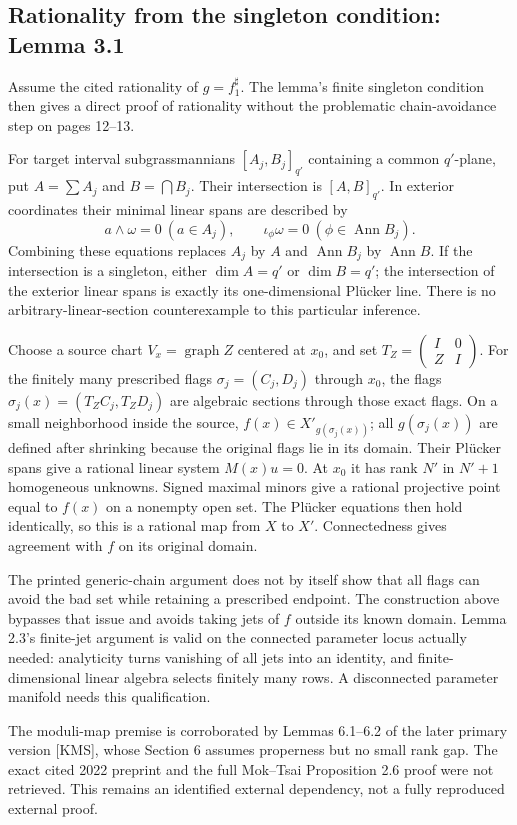 \documentclass[10pt]{article}
\begin{document}
\subsection*{Rationality from the singleton condition: Lemma 3.1}
Assume the cited rationality of \(g=f_1^\sharp\). The lemma’s finite singleton condition then gives a direct proof of rationality without the problematic chain-avoidance step on pages 12–13.\par
For target interval subgrassmannians \([A_j,B_j]_{q'}\) containing a common \(q'\)-plane, put \(A=\sum A_j\) and \(B=\bigcap B_j\). Their intersection is \([A,B]_{q'}\). In exterior coordinates their minimal linear spans are described by \[a\wedge\omega=0\ (a\in A_j),\qquad
 \iota_\phi\omega=0\ (\phi\in\operatorname{Ann}B_j).\] Combining these equations replaces \(A_j\) by \(A\) and \(\operatorname{Ann}B_j\) by \(\operatorname{Ann}B\). If the intersection is a singleton, either \(\dim A=q'\) or \(\dim B=q'\); the intersection of the exterior linear spans is exactly its one-dimensional Plücker line. There is no arbitrary-linear-section counterexample to this particular inference.\par
Choose a source chart \(V_x=\operatorname{graph}Z\) centered at \(x_0\), and set \(T_Z=\left(\begin{smallmatrix}I&0\\Z&I\end{smallmatrix}\right)\). For the finitely many prescribed flags \(\sigma_j=(C_j,D_j)\) through \(x_0\), the flags \(\sigma_j(x)=(T_ZC_j,T_ZD_j)\) are algebraic sections through those exact flags. On a small neighborhood inside the source, \(f(x)\in X'_{g(\sigma_j(x))}\); all \(g(\sigma_j(x))\) are defined after shrinking because the original flags lie in its domain. Their Plücker spans give a rational linear system \(M(x)u=0\). At \(x_0\) it has rank \(N'\) in \(N'+1\) homogeneous unknowns. Signed maximal minors give a rational projective point equal to \(f(x)\) on a nonempty open set. The Plücker equations then hold identically, so this is a rational map from \(X\) to \(X'\). Connectedness gives agreement with \(f\) on its original domain.\par
The printed generic-chain argument does not by itself show that all flags can avoid the bad set while retaining a prescribed endpoint. The construction above bypasses that issue and avoids taking jets of \(f\) outside its known domain. Lemma 2.3’s finite-jet argument is valid on the connected parameter locus actually needed: analyticity turns vanishing of all jets into an identity, and finite-dimensional linear algebra selects finitely many rows. A disconnected parameter manifold needs this qualification.\par
The moduli-map premise is corroborated by Lemmas 6.1–6.2 of the later primary version [KMS], whose Section 6 assumes properness but no small rank gap. The exact cited 2022 preprint and the full Mok–Tsai Proposition 2.6 proof were not retrieved. This remains an identified external dependency, not a fully reproduced external proof.\par
\end{document}
